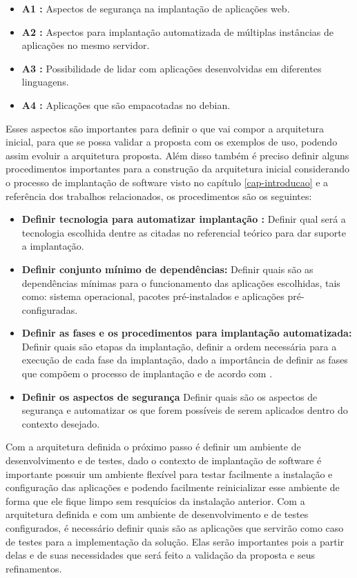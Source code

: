 \begin{itemize}
  \item  \textbf{A1 :} Aspectos de segurança na implantação de aplicações web.
  \item  \textbf{A2 :} Aspectos para implantação automatizada de múltiplas instâncias de
   aplicações no mesmo servidor.
  \item  \textbf{A3 :} Possibilidade de lidar com aplicações desenvolvidas em
  diferentes linguagens.
  \item  \textbf{A4 :} Aplicações que são empacotadas no debian.
\end{itemize}

Esses aspectos são importantes para definir o que vai compor a arquitetura inicial,
para que se possa validar a proposta com os exemplos de uso,
podendo assim evoluir a arquitetura proposta. Além disso também é preciso definir
alguns procedimentos importantes para a construção da arquitetura inicial
considerando o processo de implantação de software visto no
capítulo \ref{cap-introducao} e a referência dos trabalhos relacionados, os procedimentos
são os seguintes:

\begin{itemize}
  \item  \textbf{Definir tecnologia para automatizar implantação :}  Definir qual será a
  tecnologia escolhida dentre as citadas no referencial teórico para dar suporte
  a implantação.
  \item  \textbf{Definir conjunto mínimo de dependências:} Definir quais são as dependências
  mínimas para o funcionamento das aplicações escolhidas, tais como: sistema operacional,
  pacotes pré-instalados e aplicações pré-configuradas.
  \item  \textbf{Definir as fases e os procedimentos para implantação automatizada:}
   Definir quais são etapas da implantação, definir a ordem necessária para a execução de
  cada fase da implantação, dado a importância de definir as fases que compõem o processo de
  implantação e de acordo com \cite{omg2006}.
  \item  \textbf{Definir os aspectos de segurança} Definir quais são os aspectos de segurança
  e automatizar os que forem possíveis de serem aplicados dentro do contexto desejado.
\end{itemize}

Com a arquitetura definida o próximo passo é definir um ambiente de desenvolvimento e de
testes, dado o contexto de implantação de software é importante possuir um ambiente flexível para
testar facilmente a instalação e configuração das aplicações e podendo facilmente
reinicializar esse ambiente de forma que ele fique limpo sem resquícios da instalação
anterior. Com a arquitetura definida e com um ambiente de desenvolvimento e de testes configurados, é
necessário definir quais são as aplicações que servirão como caso de testes
para a implementação da solução. Elas serão importantes pois a partir delas
e de suas necessidades que será feito a validação da proposta e seus refinamentos.

